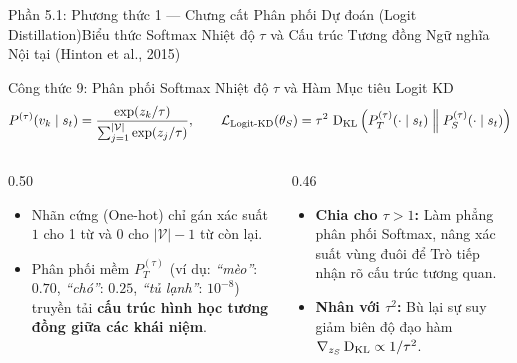 \begin{frame}{Phần 5.1: Phương thức 1 --- Chưng cất Phân phối Dự đoán (Logit Distillation)}{Biểu thức Softmax Nhiệt độ $\tau$ và Cấu trúc Tương đồng Ngữ nghĩa Nội tại (Hinton et al., 2015)}
  \begin{block}{Công thức 9: Phân phối Softmax Nhiệt độ $\tau$ và Hàm Mục tiêu Logit KD}
    \[
      P^{(\tau)}(v_k \mid s_t) = \frac{\exp(z_k / \tau)}{\sum_{j=1}^{|\mathcal{V}|} \exp(z_j / \tau)}, \qquad
      \mathcal{L}_{\text{Logit-KD}}(\theta_S) = \tau^2 \, \operatorname{D_{\mathrm{KL}}}\Big( P_T^{(\tau)}(\cdot \mid s_t) \;\Big\|\; P_S^{(\tau)}(\cdot \mid s_t) \Big)
    \]
  \end{block}

  \begin{columns}[T,onlytextwidth]
    \begin{column}{0.50\textwidth}
      \footnotesize
      \begin{itemize}\setlength{\itemsep}{4pt}
        \item Nhãn cứng (One-hot) chỉ gán xác suất $1$ cho 1 từ và $0$ cho $|\mathcal{V}|-1$ từ còn lại.
        \item Phân phối mềm $P_T^{(\tau)}$ (ví dụ: \textit{``mèo''}: $0.70$, \textit{``chó''}: $0.25$, \textit{``tủ lạnh''}: $10^{-8}$) truyền tải \textbf{cấu trúc hình học tương đồng giữa các khái niệm}.
      \end{itemize}
    \end{column}
    \begin{column}{0.46\textwidth}
      \footnotesize
      \begin{itemize}\setlength{\itemsep}{4pt}
        \item \textbf{Chia cho $\tau > 1$:} Làm phẳng phân phối Softmax, nâng xác suất vùng đuôi để Trò tiếp nhận rõ cấu trúc tương quan.
        \item \textbf{Nhân với $\tau^2$:} Bù lại sự suy giảm biên độ đạo hàm $\nabla_{z_S}\operatorname{D_{\mathrm{KL}}} \propto 1/\tau^2$.
      \end{itemize}
    \end{column}
  \end{columns}
\end{frame}

